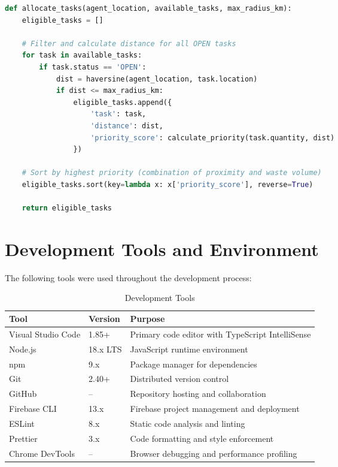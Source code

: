 \documentclass[a4paper,12pt,oneside]{report}
\begin{document}
\begin{lstlisting}[language=Python, caption={Agent-Task Matching Algorithm}]
def allocate_tasks(agent_location, available_tasks, max_radius_km):
    eligible_tasks = []
    
    # Filter and calculate distance for all OPEN tasks
    for task in available_tasks:
        if task.status == 'OPEN':
            dist = haversine(agent_location, task.location)
            if dist <= max_radius_km:
                eligible_tasks.append({
                    'task': task,
                    'distance': dist,
                    'priority_score': calculate_priority(task.quantity, dist)
                })
                
    # Sort by highest priority (combination of proximity and waste volume)
    eligible_tasks.sort(key=lambda x: x['priority_score'], reverse=True)
    
    return eligible_tasks
\end{lstlisting}


\section{Development Tools and Environment}

\noindent The following tools were used throughout the development process:

\begin{table}[h!]
\centering
\caption{Development Tools}
\label{tab:dev-tools}
\begin{tabular}{|p{3.5cm}|p{3cm}|p{5.5cm}|}
\hline
\textbf{Tool} & \textbf{Version} & \textbf{Purpose} \\
\hline
Visual Studio Code & 1.85+ & Primary code editor with TypeScript IntelliSense \\
\hline
Node.js & 18.x LTS & JavaScript runtime environment \\
\hline
npm & 9.x & Package manager for dependencies \\
\hline
Git & 2.40+ & Distributed version control \\
\hline
GitHub & -- & Repository hosting and collaboration \\
\hline
Firebase CLI & 13.x & Firebase project management and deployment \\
\hline
ESLint & 8.x & Static code analysis and linting \\
\hline
Prettier & 3.x & Code formatting and style enforcement \\
\hline
Chrome DevTools & -- & Browser debugging and performance profiling \\
\hline
\end{tabular}
\end{table}
\end{document}
